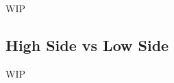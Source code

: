 \documentclass[main.tex]{subfiles}
\begin{document}
WIP


\subsection{High Side vs Low Side}

WIP










\end{document}
